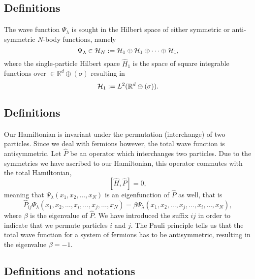 \documentclass[%
twoside,                 %
final,                   %
10pt]{article}
\begin{document}
\subsection{Definitions}

\paragraph{}
The wave function $\Psi_{\lambda}$ is sought in the Hilbert space of either symmetric or anti-symmetric $N$-body functions, namely
\[
\Psi_{\lambda}\in {\cal H}_N:= {\cal H}_1\oplus{\cal H}_1\oplus\dots\oplus{\cal H}_1,
\]
where the single-particle Hilbert space $\hat{H}_1$ is the space of square integrable functions over
$\in {\mathbb{R}}^{d}\oplus (\sigma)$
resulting in
\[
{\cal H}_1:= L^2(\mathbb{R}^{d}\oplus (\sigma)).
\]





\subsection{Definitions}

\paragraph{}
Our Hamiltonian is invariant under the permutation (interchange) of two particles.
Since we deal with fermions however, the total wave function is antisymmetric.
Let $\hat{P}$ be an operator which interchanges two particles.
Due to the symmetries we have ascribed to our Hamiltonian, this operator commutes with the total Hamiltonian,
\[
[\hat{H},\hat{P}] = 0,
\]
meaning that $\Psi_{\lambda}(x_1, x_2, \dots , x_N)$ is an eigenfunction of 
$\hat{P}$ as well, that is
\[
\hat{P}_{ij}\Psi_{\lambda}(x_1, x_2, \dots,x_i,\dots,x_j,\dots,x_N)=
\beta\Psi_{\lambda}(x_1, x_2, \dots,x_j,\dots,x_i,\dots,x_N),
\]
where $\beta$ is the eigenvalue of $\hat{P}$. We have introduced the suffix $ij$ in order to indicate that we permute particles $i$ and $j$.
The Pauli principle tells us that the total wave function for a system of fermions
has to be antisymmetric, resulting in the eigenvalue $\beta = -1$.




\subsection{Definitions and notations}
\end{document}
